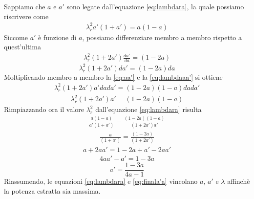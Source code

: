 Sappiamo che $a$ e $a'$ sono legate dall'equazione \ref{eq:lambdara}, la quale possiamo riscrivere come
\begin{align*}
\lambda_r^2 a' \left( 1+ a' \right) = a \left( 1 - a \right)
\end{align*}
Siccome $a'$ è funzione di $a$, possiamo differenziare membro a membro rispetto a quest'ultima
\begin{align*}
\lambda_r^2 \left( 1+ 2a' \right) \frac{da'}{da} = \left( 1 - 2a \right)
\end{align*}
\begin{equation}\label{eq:lambdaaa'}
\lambda_r^2 \left( 1+ 2a' \right) da' = \left( 1 - 2a \right)da
\end{equation}
Moltiplicando membro a membro la \ref{eq:aa'} e la \ref{eq:lambdaaa'} si ottiene
\begin{align*}
\lambda_r^2 \left( 1 + 2a' \right) a' da da' = \left( 1 - 2a \right) \left( 1-a \right) da da'
\end{align*}
\begin{align*}
\lambda_r^2 \left( 1 + 2a' \right) a' = \left( 1- 2a \right) \left(1 -a \right)
\end{align*}
Rimpiazzando ora il valore $\lambda_r^2$ dall'equazione \ref{eq:lambdara} risulta
\begin{align*}
\frac{a \left(1 - a \right)}{a' \left(1 + a' \right)} = \frac{\left( 1 - 2a \right) \left( 1 -a \right)}{\left(1 + 2a' \right) a'}
\end{align*}
\begin{align*}
\frac{a}{\left( 1 + a' \right)} = \frac{\left( 1 - 2a \right)}{\left( 1 + 2a' \right)}
\end{align*}
\begin{align*}
a + 2 a a' = 1 - 2a + a' - 2aa'
\end{align*}
\begin{align*}
4aa' -a' = 1 - 3a
\end{align*}
\begin{equation}\label{eq:finala'a}
a' = \frac{1 - 3a}{4a -1}
\end{equation}
Riassumendo, le equazioni \ref{eq:lambdara} e \ref{eq:finala'a} vincolano $a$, $a'$ e $\lambda$ affinchè la potenza estratta sia massima.

